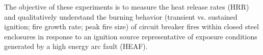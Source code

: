 \documentclass[12pt]{article}
\begin{document}
%
%

The objective of these experiments is to measure the heat release rates (HRR) and qualitatively understand the burning behavior (transient vs. sustained ignition; fire growth rate; peak fire size) of circuit breaker fires within closed steel enclosures in response to an ignition source representative of exposure conditions generated by a high energy arc fault (HEAF). 

\newpage
\end{document}
